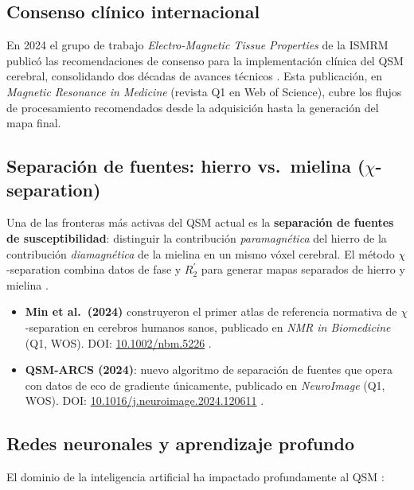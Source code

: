\documentclass[12pt, a4paper]{article}
\begin{document}
\subsection{Consenso clínico internacional}

En 2024 el grupo de trabajo \emph{Electro-Magnetic Tissue Properties} de la ISMRM publicó las recomendaciones de consenso para la implementación clínica del QSM cerebral, consolidando dos décadas de avances técnicos \cite{Karsa2024Consensus}. Esta publicación, en \emph{Magnetic Resonance in Medicine} (revista Q1 en Web of Science), cubre los flujos de procesamiento recomendados desde la adquisición hasta la generación del mapa final.

\subsection{Separación de fuentes: hierro vs.\ mielina (\texorpdfstring{$\chi$}{χ}-separation)}

Una de las fronteras más activas del QSM actual es la \textbf{separación de fuentes de susceptibilidad}: distinguir la contribución \emph{paramagnética} del hierro de la contribución \emph{diamagnética} de la mielina en un mismo vóxel cerebral. El método $\chi$-separation combina datos de fase y $R_2^{\prime}$ para generar mapas separados de hierro y mielina \cite{Shin2021ChiSep, Min2024Atlas}.

\begin{itemize}[leftmargin=2em]
  \item \textbf{Min et al.\ (2024)} construyeron el primer atlas de referencia normativa de $\chi$-separation en cerebros humanos sanos, publicado en \emph{NMR in Biomedicine} (Q1, WOS). DOI: \href{https://doi.org/10.1002/nbm.5226}{10.1002/nbm.5226} \cite{Min2024Atlas}.
  \item \textbf{QSM-ARCS (2024)}: nuevo algoritmo de separación de fuentes que opera con datos de eco de gradiente únicamente, publicado en \emph{NeuroImage} (Q1, WOS). DOI: \href{https://doi.org/10.1016/j.neuroimage.2024.120611}{10.1016/j.neuroimage.2024.120611} \cite{Dimov2024ARCS}.
\end{itemize}

\subsection{Redes neuronales y aprendizaje profundo}

El dominio de la inteligencia artificial ha impactado profundamente al QSM \cite{Gao2020DLoverview}:
\end{document}
